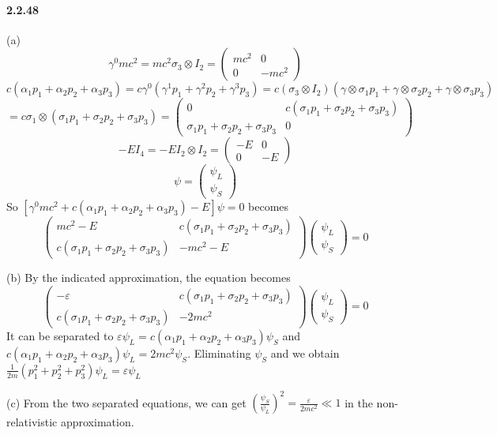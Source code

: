 \documentclass[a4paper]{article}
\begin{document}
\paragraph{2.2.48}
(a) \[\gamma^0mc^2=mc^2\sigma_3\otimes I_2=
\begin{pmatrix}mc^2&0\\0&-mc^2\end{pmatrix}\] \[c(\alpha_1p_1+\alpha_2p_2+\alpha_3p_3)=c\gamma^0(\gamma^1p_1+\gamma^2p_2+\gamma^3p_3)=c(\sigma_3\otimes I_2)(\gamma\otimes\sigma_1p_1+\gamma\otimes\sigma_2p_2+\gamma\otimes\sigma_3p_3)\]
\[=c\sigma_1\otimes(\sigma_1p_1+\sigma_2p_2+\sigma_3p_3)=
\begin{pmatrix}
0&c(\sigma_1p_1+\sigma_2p_2+\sigma_3p_3)\\\sigma_1p_1+\sigma_2p_2+\sigma_3p_3&0\end{pmatrix}\]
\[-EI_4=-EI_2\otimes I_2=
\begin{pmatrix}
-E&0\\0&-E
\end{pmatrix}
\]
\[\psi=
\begin{pmatrix}
\psi_L\\\psi_S
\end{pmatrix}
\]
So $\left[\gamma^0mc^2+c(\alpha_1p_1+\alpha_2p_2+\alpha_3p_3)-E\right]\psi=0$ becomes
\[
\begin{pmatrix}
mc^2-E&c(\sigma_1p_1+\sigma_2p_2+\sigma_3p_3)\\
c(\sigma_1p_1+\sigma_2p_2+\sigma_3p_3)&-mc^2-E
\end{pmatrix}
\begin{pmatrix}
\psi_L\\\psi_S
\end{pmatrix}=0
\]

(b) By the indicated approximation, the equation becomes
\[
\begin{pmatrix}
-\varepsilon&c(\sigma_1p_1+\sigma_2p_2+\sigma_3p_3)\\
c(\sigma_1p_1+\sigma_2p_2+\sigma_3p_3)&-2mc^2
\end{pmatrix}
\begin{pmatrix}
\psi_L\\\psi_S
\end{pmatrix}=0
\]
It can be separated to $\varepsilon\psi_L=c(\alpha_1p_1+\alpha_2p_2+\alpha_3p_3)\psi_S$ and $c(\alpha_1p_1+\alpha_2p_2+\alpha_3p_3)\psi_L=2mc^2\psi_S$. Eliminating $\psi_S$ and we obtain $\frac{1}{2m}\left(p_1^2+p_2^2+p_3^2\right)\psi_L=\varepsilon\psi_L$

(c) From the two separated equations, we can get $(\frac{\psi_S}{\psi_L})^2=\frac{\varepsilon}{2mc^2}\ll1$ in the non-relativistic approximation.
\end{document}
